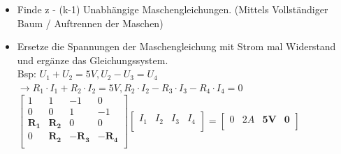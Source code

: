 \begin{center}
\begin{itemize}
					                \item Finde z - (k-1) Unabhängige Maschengleichungen. (Mittels Vollständiger Baum / Auftrennen der Maschen)
					                \item Ersetze die Spannungen der Maschengleichung mit Strom mal Widerstand und ergänze das Gleichungssystem.
					                \\ Bsp:
					                $U_1 + U_2 = 5V, U_2 - U_3 = U_4$ \\ $ \rightarrow R_1 \cdot I_1 + R_2 \cdot I_2 = 5V, R_2 \cdot I_2 - R_3 \cdot I_3 - R_4 \cdot I_4 = 0$ \\
					                $
					 \left[ {\begin{array}{cccc}
					    1 & 1 & -1 & 0 \\
					    0 & 0 & 1 & -1 \\
					    \mathbf{R_1} & \mathbf{R_2} & 0 & 0 \\
					    0 & \mathbf{R_2} & \mathbf{-R_3} & \mathbf{-R_4} \\
					\end{array} } \right] \left[ {\begin{array}{c} I_1 & I_2 & I_3 & I_4 \\ \end{array} } \right] =   \left[ {\begin{array}{c}  0 & 2A & \mathbf{5V} & \mathbf{0} \\ \end{array} } \right] $ \\

					              \end{itemize}
					            \end{center}
					            \iend








